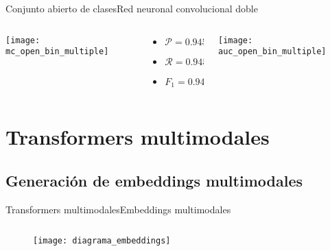 \documentclass[aspectratio = 169]{beamer}
\begin{document}
			\begin{frame}{Conjunto abierto de clases}{Red neuronal convolucional doble}
				\begin{columns}
					\begin{column}{.4\textwidth}
						\texttt{[image: mc\_open\_bin\_multiple]}
					\end{column}
					\begin{column}{.22\textwidth}
						\begin{block}{}
							\begin{itemize}
								\item $\mathcal{P} = 0.945$
								\item $\mathcal{R} = 0.945$
								\item $F_1 = 0.945$
							\end{itemize}
						\end{block}
					\end{column}
					\begin{column}{.4\textwidth}
						\texttt{[image: auc\_open\_bin\_multiple]}
					\end{column}
				\end{columns}
			\end{frame}
	
	\section{Transformers multimodales}
	
		\subsection{Generación de embeddings multimodales}
	
			\begin{frame}{Transformers multimodales}{Embeddings multimodales}
				\begin{columns}
					\begin{column}{.5\textwidth}
						\begin{block}{}
							\begin{figure}
								\centering
								\texttt{[image: diagrama\_embeddings]}
								\label{fig:diagrama_embeddings}
							\end{figure}
						\end{block}
					\end{column}
				\end{columns}
			\end{frame}
	
\end{document}
